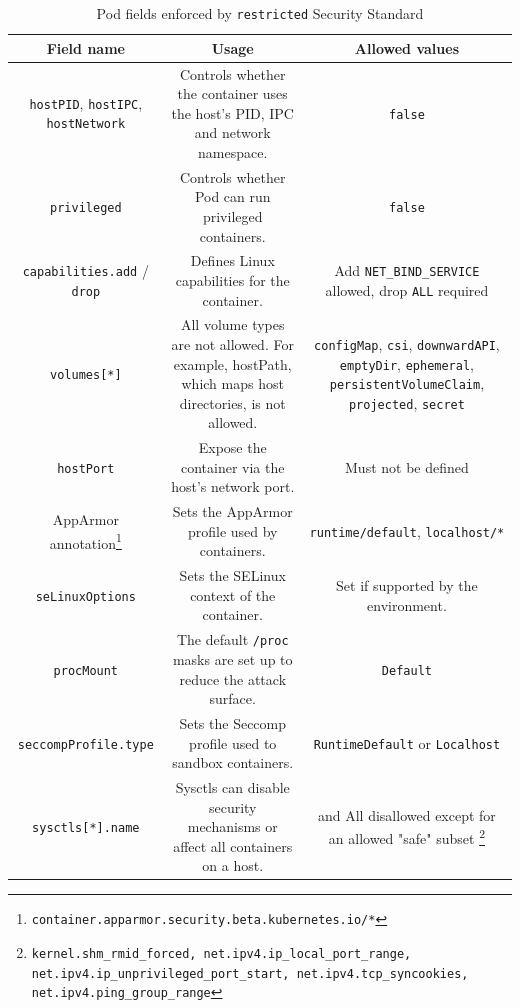 \documentclass[english, 12pt, a4paper, sci, utf8, a-2b, online]{aaltothesis}
\begin{document}
\begin{table}[H]
  \centering
  \caption{Pod fields enforced by \lstinline{restricted} Security Standard}
  \label{table:pod-hardening}
  \sffamily%
  \small
  \begin{minipage}{\textwidth}
  \renewcommand{\thempfootnote}{\arabic{mpfootnote}} %
  \begin{tabularx}{\textwidth}{CCC}
    \hline
    \textbf{Field name} & \textbf{Usage} & \textbf{Allowed values}\\ \hline
    \lstinline{hostPID}, \lstinline{hostIPC}, \lstinline{hostNetwork} & Controls whether the container uses the host's PID, IPC and network namespace. & \lstinline{false} \\ \hline
    \lstinline{privileged} & Controls whether Pod can run privileged containers. & \lstinline{false} \\ \hline
    \lstinline{capabilities.add} / \lstinline{drop} & Defines Linux capabilities for the container. & Add \lstinline{NET_BIND_SERVICE} allowed, drop \lstinline{ALL} required \\ \hline
    \lstinline{volumes[*]} & All volume types are not allowed. For example, hostPath, which maps host directories, is not allowed. & \lstinline{configMap}, \lstinline{csi}, \lstinline{downwardAPI}, \lstinline{emptyDir}, \lstinline{ephemeral}, \lstinline{persistentVolumeClaim}, \lstinline{projected}, \lstinline{secret} \\ \hline
    \lstinline{hostPort} & Expose the container via the host's network port. & Must not be defined \\ \hline
    AppArmor annotation\footnote{\lstinline{container.apparmor.security.beta.kubernetes.io/*}} & Sets the AppArmor profile used by containers. & \lstinline{runtime/default}, \lstinline{localhost/*} \\ \hline
    \lstinline{seLinuxOptions} & Sets the SELinux context of the container. & Set if supported by the environment. \\ \hline
    \lstinline{procMount} & The default \lstinline{/proc} masks are set up to reduce the attack surface. & \lstinline{Default} \\ \hline
    \lstinline{seccompProfile.type} & Sets the Seccomp profile used to sandbox containers. & \lstinline{RuntimeDefault} or \lstinline{Localhost} \\ \hline
    \lstinline{sysctls[*].name} & Sysctls can disable security mechanisms or affect all containers on a host. &  and All disallowed except for an allowed "safe" subset \footnote{\lstinline{kernel.shm_rmid_forced, net.ipv4.ip_local_port_range, net.ipv4.ip_unprivileged_port_start, net.ipv4.tcp_syncookies, net.ipv4.ping_group_range}} \\ \hline

\end{tabularx}
\end{minipage}
\end{table}
\end{document}
